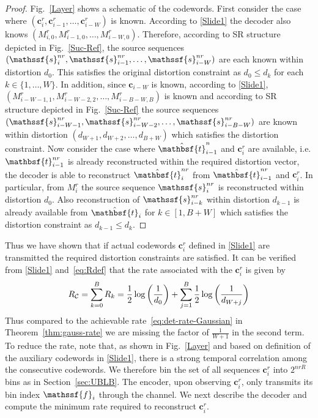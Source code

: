 \documentclass[journal, twocolumn, 10pt]{IEEEtran}
\newcommand{\bc}{{\mathbf{c}}}
\newcommand{\rvf}{{\mathssf{f}}}    %
\newcommand{\rvs}{{\mathssf{s}}}    %
\newcommand{\rvbt}{{\mathbsf{t}}}
\begin{document}
{{\begin{proof}
Fig.~\ref{Layer} shows a schematic of the codewords. First consider the case where $(\bc^r_{i}, \bc^r_{i-1},\ldots, \bc^r_{i-W})$ is known. According to \eqref{Slide1} the decoder also knows $(M^r_{i,0}, M^r_{i-1,0},\ldots, M^r_{i-W,0}).$  Therefore, according to SR structure depicted in Fig.~\ref{Suc-Ref}, the source sequences $(\rvs^{nr}_{i}, \rvs^{nr}_{i-1}, \ldots, \rvs^{nr}_{i-W})$ are each known within distortion $d_{0}$. This satisfies the original distortion constraint as $d_{0}\le d_{k}$ for each $k\in\{1, \ldots, W\}$. In addition, since $\bc_{i-W}$ is known,  according to \eqref{Slide1}, $(M^r_{i-W-1,1}, M^r_{i-W-2,2},\ldots, M^r_{i-B-W,B})$ is known and according to SR structure depicted in Fig.~\ref{Suc-Ref} the source sequences $(\rvs^{nr}_{i-W-1}, \rvs^{nr}_{i-W-2}, \ldots, \rvs^{nr}_{i-B-W})$ are known within distortion $(d_{W+1}, d_{W+2}, \ldots, d_{B+W})$ which satisfies the distortion constraint. Now consider the case where $\hat{\rvbt}_{i-1}^n$ and $\bc^r_{i}$ are available, i.e. $\rvbt^{nr}_{i-1}$ is already reconstructed within the required distortion vector, the decoder is able to reconstruct $\hat{\rvbt}^{nr}_{i}$ from $\hat{\rvbt}^{nr}_{i-1}$ and $\bc^r_{i}$. In particular, from $M^r_{i}$ the source sequence $\rvs^{nr}_{i}$ is reconstructed within distortion $d_0$. Also reconstruction of $\rvs^{nr}_{i-k}$ within distortion $d_{k-1}$ is already available from $\hat{\rvbt}_{i}$ for $k\in [1,B+W]$ which satisfies the distortion constraint as $d_{k-1}\le d_{k}$. 
\end{proof}

Thus we have shown that if actual codewords $\bc^r_{i}$ defined in \eqref{Slide1} are transmitted the required distortion constraints are satisfied. It can be verified from \eqref{Slide1} and~\eqref{eq:Rdef}
that the rate associated with the  $\bc_{i}^r$ is given by 
\begin{align}
R_{\cal C}= \sum_{k=0}^{B} R_{k}  = \frac{1}{2}\log\left(\frac{1}{d_0}\right) + \sum_{j=1}^B \frac{1}{2}\log\left(\frac{1}{d_{W+j}}\right) \label{eq:Rc}
\end{align}
Thus compared to the achievable rate~\eqref{eq:det-rate-Gaussian} in Theorem~\ref{thm:gauss-rate} we are missing the factor of $\frac{1}{W+1}$ in the second term. To reduce the rate, note that, as shown in Fig.~\ref{Layer} and based on definition of the auxiliary codewords in \eqref{Slide1}, there is a strong temporal correlation among the consecutive codewords.  We therefore bin the set of all sequences $\bc_i^r$ into $2^{nrR}$ bins as in Section~\ref{sec:UBLB}. The encoder, upon observing $\bc_{i}^r$, only transmits its bin index $\rvf_{i}$ through the channel.  We next describe the decoder and compute the minimum rate required to reconstruct  $\bc_i^r$.

}}
\end{document}
